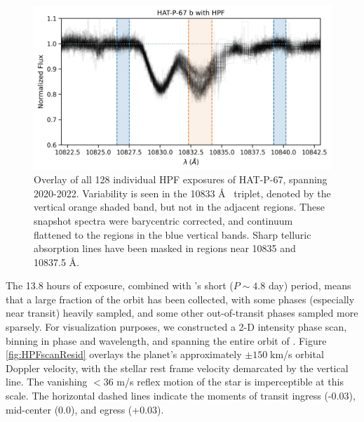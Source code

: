 \documentclass[twocolumn]{aastex631}
\begin{document}
\begin{figure}
    \includegraphics[width=\linewidth]{figures/HAT_P_67b_He_spectrum.png}
    \caption{Overlay of all 128 individual HPF exposures of HAT-P-67, spanning 2020-2022. Variability is seen in the  10833 \AA~ triplet, denoted by the vertical orange shaded band, but not in the adjacent regions.  These snapshot spectra were barycentric corrected, and continuum flattened to the regions in the blue vertical bands.  Sharp telluric absorption lines have been masked in regions near 10835 and 10837.5 \AA.}
    \label{fig:HPFheliumOverview}
\end{figure}


The 13.8 hours of exposure, combined with 's short ($P\sim4.8$ day) period, means that a large fraction of the orbit has been collected, with some phases (especially near transit) heavily sampled, and some other out-of-transit phases sampled more sparsely. For visualization purposes, we constructed a 2-D intensity phase scan, binning in phase and wavelength, and spanning the entire orbit of .  Figure \ref{fig:HPFscanResid} overlays the planet's approximately $\pm150\;$km/s orbital Doppler velocity, with the stellar rest frame velocity demarcated by the vertical line.  The vanishing $<36$ m/s reflex motion of the star is imperceptible at this scale.  The horizontal dashed lines indicate the moments of transit ingress (-0.03), mid-center (0.0), and egress (+0.03).
\end{document}

